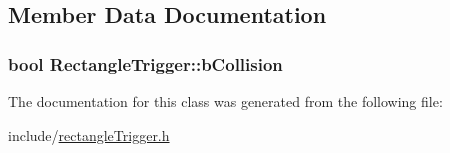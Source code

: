 \subsection{Member Data Documentation}
\subsubsection[{\texorpdfstring{b\+Collision}{bCollision}}]{\setlength{\rightskip}{0pt plus 5cm}bool Rectangle\+Trigger\+::b\+Collision\hspace{0.3cm}{\ttfamily [private]}}\hypertarget{class_rectangle_trigger_af6349342536e699e721edda955df97ce}{}\label{class_rectangle_trigger_af6349342536e699e721edda955df97ce}


The documentation for this class was generated from the following file\+:\begin{DoxyCompactItemize}
\item 
include/\hyperlink{rectangle_trigger_8h}{rectangle\+Trigger.\+h}\end{DoxyCompactItemize}
